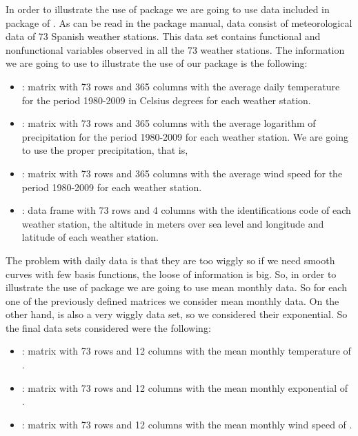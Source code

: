 In order to illustrate the use of  package we are going to use  data included in  package of \cite{Febrero2012}. As can be read in the package manual,  data consist of meteorological data of 73 Spanish weather stations. This data set contains functional and nonfunctional variables observed in all the 73 weather stations. The information we are going to use to illustrate the use of our  package is the following:
\begin{itemize}
 \item {}: matrix with 73 rows and 365 columns with the average daily temperature for the period 1980-2009 in Celsius degrees for each weather station.
 \item {}: matrix with 73 rows and 365 columns with the average logarithm of precipitation for the period 1980-2009 for each weather station. We are going to use the proper precipitation, that is, 
 \item {}: matrix with 73 rows and 365 columns with the average wind speed for the period 1980-2009 for each weather station.
  \item {}: data frame with 73 rows and 4 columns with the identifications code of each weather station, the altitude in meters over sea level and longitude and latitude of each weather station.
 \end{itemize}

The problem with daily data is that they are too wiggly so if we need smooth curves with few basis functions, the loose of information is big. So, in order to illustrate the use of  package we are going to use mean monthly data. So for each one of the previously defined matrices we consider mean monthly data. On the other hand,  is also a very wiggly data set, so we considered their exponential. So the final data sets considered were the following:
\begin{itemize}
 \item {}: matrix with 73 rows and 12 columns with the mean monthly temperature of .
 \item {}: matrix with 73 rows and 12 columns with the mean monthly exponential of .
 \item {}: matrix with 73 rows and 12 columns with the mean monthly wind speed of .
 \end{itemize}

